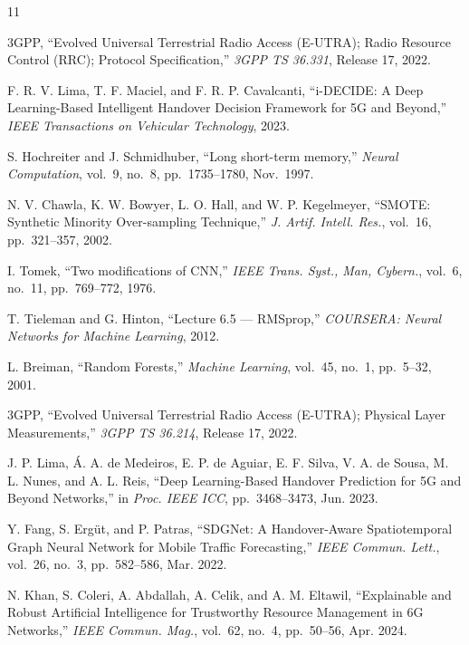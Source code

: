 \documentclass[journal]{IEEEtran}
\begin{document}
\begin{thebibliography}{11}

3GPP, ``Evolved Universal Terrestrial Radio Access (E-UTRA); Radio
Resource Control (RRC); Protocol Specification,''
\emph{3GPP TS 36.331}, Release 17, 2022.

F. R. V. Lima, T. F. Maciel, and F. R. P. Cavalcanti,
``i-DECIDE: A Deep Learning-Based Intelligent Handover Decision Framework
for 5G and Beyond,''
\emph{IEEE Transactions on Vehicular Technology}, 2023.

S. Hochreiter and J. Schmidhuber,
``Long short-term memory,''
\emph{Neural Computation}, vol.~9, no.~8, pp.~1735--1780, Nov.~1997.

N. V. Chawla, K. W. Bowyer, L. O. Hall, and W. P. Kegelmeyer,
``SMOTE: Synthetic Minority Over-sampling Technique,''
\emph{J. Artif. Intell. Res.}, vol.~16, pp.~321--357, 2002.

I. Tomek,
``Two modifications of CNN,''
\emph{IEEE Trans. Syst., Man, Cybern.}, vol.~6, no.~11,
pp.~769--772, 1976.

T. Tieleman and G. Hinton,
``Lecture 6.5 --- RMSprop,''
\emph{COURSERA: Neural Networks for Machine Learning}, 2012.

L. Breiman,
``Random Forests,''
\emph{Machine Learning}, vol.~45, no.~1, pp.~5--32, 2001.

3GPP, ``Evolved Universal Terrestrial Radio Access (E-UTRA); Physical
Layer Measurements,'' \emph{3GPP TS 36.214}, Release 17, 2022.

J. P. Lima, \'{A}. A. de Medeiros, E. P. de Aguiar, E. F. Silva,
V. A. de Sousa, M. L. Nunes, and A. L. Reis,
``Deep Learning-Based Handover Prediction for 5G and Beyond Networks,''
in \emph{Proc. IEEE ICC}, pp.~3468--3473, Jun. 2023.

Y. Fang, S. Erg\"{u}t, and P. Patras,
``SDGNet: A Handover-Aware Spatiotemporal Graph Neural Network for
Mobile Traffic Forecasting,''
\emph{IEEE Commun. Lett.}, vol.~26, no.~3, pp.~582--586, Mar. 2022.

N. Khan, S. Coleri, A. Abdallah, A. Celik, and A. M. Eltawil,
``Explainable and Robust Artificial Intelligence for Trustworthy
Resource Management in 6G Networks,''
\emph{IEEE Commun. Mag.}, vol.~62, no.~4, pp.~50--56, Apr. 2024.

\end{thebibliography}
\end{document}
